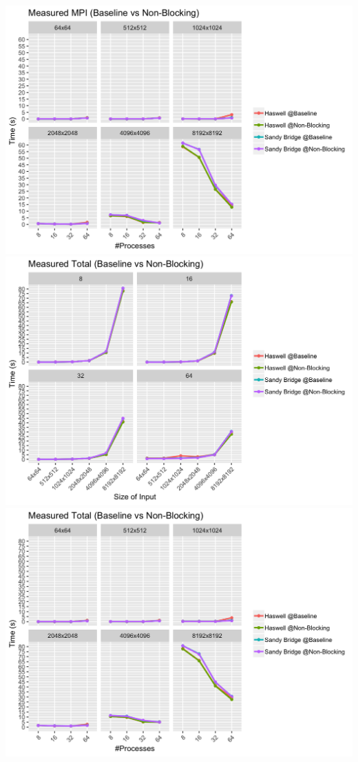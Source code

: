 \documentclass[10pt, letterpaper, twoside]{article}
\begin{document}
\begin{titlepage}
\begin{enumerate}
\includegraphics[scale = 0.18]{P2PBaseline_Measured-MPI_InputSize.png}
\vspace{5mm}
\includegraphics[scale = 0.18]{P2PBaseline_Measured-Total_Processes.png}
\includegraphics[scale = 0.18]{P2PBaseline_Measured-Total_InputSize.png}


\end{enumerate}
\end{titlepage}
\end{document}
